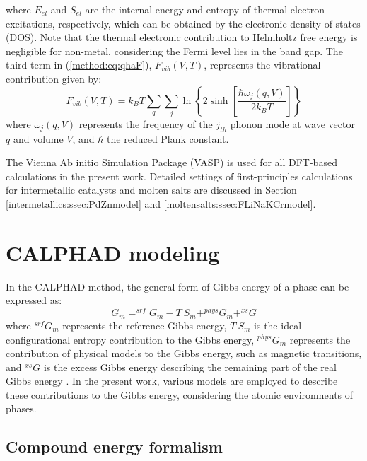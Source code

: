 where $E_{el}$ and $S_{el}$ are the internal energy and entropy of thermal electron excitations, respectively, which can be obtained by the electronic density of states (DOS). Note that the thermal electronic contribution to Helmholtz free energy is negligible for non-metal, considering the Fermi level lies in the band gap. The third term in (\ref{method:eq:qhaF}), $F_{vib}(V,T)$, represents the vibrational contribution \cite{wang2004thermodynamic, van2002effect} given by:
\begin{equation} \label{method:eq:Fvib}
    F_{vib}(V,T)=k_BT\sum_{q}\sum_{j}\ln{\left\{2\sinh{\left[\frac{\hbar\omega_j(q,V)}{2k_BT}\right]}\right\}}
\end{equation}
where $\omega_j\left(q,V\right)$ represents the frequency of the $j_{th}$ phonon mode at wave vector $q$ and volume $V$, and $\hbar$ the reduced Plank constant. 

The Vienna Ab initio Simulation Package (VASP) \cite{kresse1996efficient} is used for all DFT-based calculations in the present work. Detailed settings of first-principles calculations for intermetallic catalysts and molten salts are discussed in Section \ref{intermetallics:ssec:PdZnmodel} and \ref{moltensalts:ssec:FLiNaKCrmodel}.

\section{CALPHAD modeling} \label{method:sec:calphad}
In the CALPHAD method, the general form of Gibbs energy of a phase can be expressed as:
\begin{equation} \label{method:eq:Gm}
    G_m=^{srf}G_m-T\:S_m+^{phys}G_m+^{xs}G
\end{equation}
where $^{srf}G_m$ represents the reference Gibbs energy, $T\:S_m$ is the ideal configurational entropy contribution to the Gibbs energy, $^{phys}G_m$ represents the contribution of physical models to the Gibbs energy, such as magnetic transitions, and $^{xs}G$ is the excess Gibbs energy describing the remaining part of the real Gibbs energy \cite{lukas2007computational}. In the present work, various models are employed to describe these contributions to the Gibbs energy, considering the atomic environments of phases.

\subsection{Compound energy formalism} \label{method:ssec:CEF}

